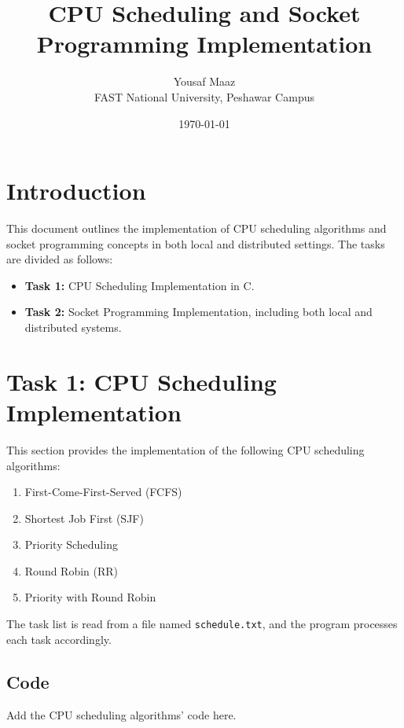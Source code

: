 \documentclass[a4paper,12pt]{article}
\title{CPU Scheduling and Socket Programming Implementation}
\author{Yousaf Maaz \\ FAST National University, Peshawar Campus}
\date{\today}
\begin{document}
\maketitle

\tableofcontents
\newpage

\section{Introduction}
This document outlines the implementation of CPU scheduling algorithms and socket programming concepts in both local and distributed settings. The tasks are divided as follows:
\begin{itemize}
    \item \textbf{Task 1:} CPU Scheduling Implementation in C.
    \item \textbf{Task 2:} Socket Programming Implementation, including both local and distributed systems.
\end{itemize}

\section{Task 1: CPU Scheduling Implementation}
This section provides the implementation of the following CPU scheduling algorithms:
\begin{enumerate}
    \item First-Come-First-Served (FCFS)
    \item Shortest Job First (SJF)
    \item Priority Scheduling
    \item Round Robin (RR)
    \item Priority with Round Robin
\end{enumerate}

The task list is read from a file named \texttt{schedule.txt}, and the program processes each task accordingly.

\subsection{Code}
Add the CPU scheduling algorithms' code here.
\end{document}
